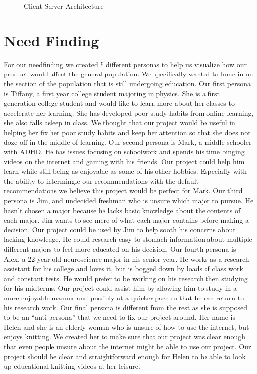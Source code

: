 \documentclass[letterpaper]{article} %
\begin{document}
\begin{figure}
	\caption{Client Server Architecture}
	\label{fig:client/server}
\end{figure}


\section{Need Finding}
For our needfinding we created 5 different personas to help us visualize how our product would affect the general population. We specifically wanted to hone in on the section of the population that is still undergoing education. Our first persona is Tiffany, a first year college student majoring in physics. She is a first generation college student and would like to learn more about her classes to accelerate her learning. She has developed poor study habits from online learning, she also falls asleep in class. We thought that our project would be useful in helping her fix her poor study habits and keep her attention so that she does not doze off in the middle of learning. Our second persona is Mark, a middle schooler with ADHD. He has issues focusing on schoolwork and spends his time binging videos on the internet and gaming with his friends. Our project could help him learn while still being as enjoyable as some of his other hobbies. Especially with the ability to intermingle our recommendations with the default recommendations we believe this project would be perfect for Mark. Our third persona is Jim, and undecided freshman who is unsure which major to pursue. He hasn't chosen a major because he lacks basic knowledge about the contents of each major. Jim wants to see more of what each major contains before making a decision. Our project could be used by Jim to help sooth his concerns about lacking knowledge. He could research easy to stomach information about multiple different majors to feel more educated on his decision. Our fourth persona is Alex, a 22-year-old neuroscience major in his senior year.  He works as a research assistant for his college and loves it, but is bogged down by loads of class work and constant tests. He would prefer to be working on his research then studying for his midterms. Our project could assist him by allowing him to study in a more enjoyable manner and possibly at a quicker pace so that he can return to his research work. Our final persona is different from the rest as she is supposed to be an “anti-persona” that we need to fix our project around. Her name is Helen and she is an elderly woman who is unsure of how to use the internet, but enjoys knitting. We created her to make sure that our project was clear enough that even people unsure about the internet might be able to use our project. Our project should be clear and straightforward enough for Helen to be able to look up educational knitting videos at her leisure. 
\end{document}
